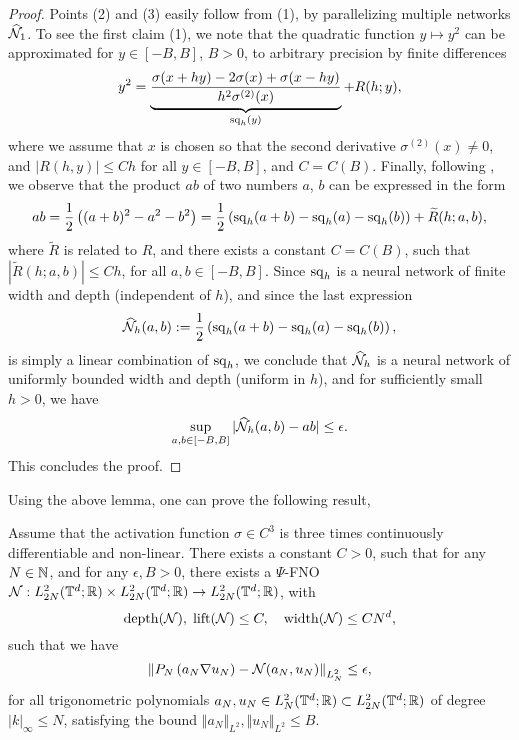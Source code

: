 \documentclass[reqno,a4paper]{amsart}
\begin{document}
\begin{proof}
Points (2) and (3) easily follow from (1), by parallelizing multiple networks $\widehat{\mathcal{N}}_1$. To see the first claim (1), we note that the quadratic function $y \mapsto y^2$ can be approximated for $y\in [-B,B]$, $B>0$, to arbitrary precision by finite differences
\[
y^2 = 
\underbrace{
\frac{\sigma(x+hy) - 2\sigma(x) + \sigma(x-hy)}{h^2 \sigma^{(2)}(x)}
}_{\mathrm{sq}_h(y)}
+ R(h;y),
\]
where we assume that $x$ is chosen so that the second derivative $\sigma^{(2)}(x) \ne 0$, and $|R(h,y)| \le Ch$ for all $y\in [-B,B]$, and $C = C(B)$. Finally, following \cite{Yar1}, we observe that the product $ab$ of two numbers $a$, $b$ can be expressed in the form
\[
ab = \frac12 \left( (a+b)^2 - a^2 - b^2\right)
= \frac12 \left( \mathrm{sq}_h(a+b) - \mathrm{sq}_h(a) - \mathrm{sq}_h(b) \right) + \widetilde{R}(h;a,b),
\]
where $\tilde{R}$ is related to $R$, and there exists a constant $C = C(B)$, such that $|\tilde{R}(h;a,b)|\le Ch$, for all $a,b \in [-B,B]$. Since $\mathrm{sq}_h$ is a neural network of finite width and depth (independent of $h$), and since the last expression
\[
\widehat{\mathcal{N}}_h(a,b) :=  \frac12 \left( \mathrm{sq}_h(a+b) - \mathrm{sq}_h(a) - \mathrm{sq}_h(b) \right),
\]
is simply a linear combination of $\mathrm{sq}_h$, we conclude that $\widehat{\mathcal{N}}_h$ is a neural network of uniformly bounded width and depth (uniform in $h$), and for sufficiently small $h>0$, we have
\[
\sup_{a,b\in [-B,B]}
|\widehat{\mathcal{N}}_h(a,b) - ab | \le \epsilon.
\]
This concludes the proof.
\end{proof}
Using the above lemma, one can prove the following result,
\begin{lemma} \label{lem:darcy-quadratic}
Assume that the activation function $\sigma\in C^3$ is three times continuously differentiable and non-linear. There exists a constant $C>0$, such that for any $N\in \mathbb{N}$, and for any $\epsilon, B > 0$, there exists a $\Psi$-FNO $\mathcal{N}: L^2_{2N}(\mathbb{T}^d;\mathbb{R})\times L^2_{2N}(\mathbb{T}^d;\mathbb{R}) \to L^2_{2N}(\mathbb{T}^d;\mathbb{R})$, with 
\[
\mathrm{depth}(\mathcal{N}), \; \mathrm{lift}(\mathcal{N}) \le C, 
\quad
\mathrm{width}(\mathcal{N}) \le C N^d,
\]
such that we have
\[
\left\Vert
P_N\left(
a_N \nabla u_N
\right)
- 
\mathcal{N}(a_N, u_N)
\right\Vert_{L^2_N}
\le 
\epsilon,
\]
for all trigonometric polynomials $a_N, u_N\in L^2_N(\mathbb{T}^d; \mathbb{R})\subset L^2_{2N}(\mathbb{T}^d; \mathbb{R})$ of degree $|k|_\infty \le N$, satisfying the bound $\Vert a_N \Vert_{L^2}, \Vert u_N \Vert_{L^2} \le B$.
\end{lemma}
\end{document}
